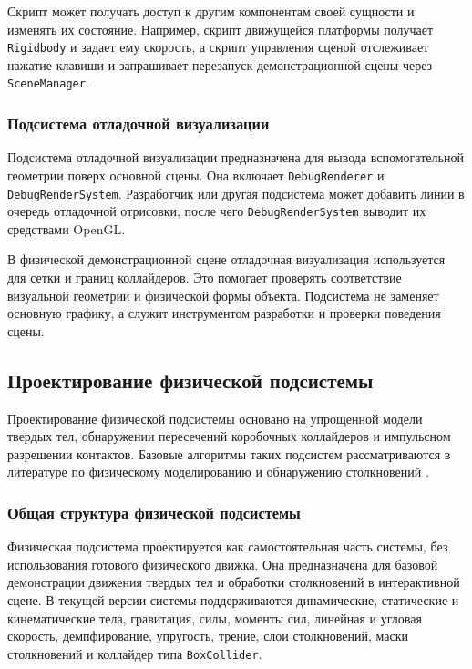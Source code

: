Скрипт может получать доступ к другим компонентам своей сущности и изменять их
состояние. Например, скрипт движущейся платформы получает \texttt{Rigidbody}
и задает ему скорость, а скрипт управления сценой отслеживает нажатие клавиши и
запрашивает перезапуск демонстрационной сцены через \texttt{SceneManager}.

\subsubsection{Подсистема отладочной визуализации}

Подсистема отладочной визуализации предназначена для вывода вспомогательной
геометрии поверх основной сцены. Она включает \texttt{DebugRenderer} и
\texttt{DebugRenderSystem}. Разработчик или другая подсистема может добавить
линии в очередь отладочной отрисовки, после чего \texttt{DebugRenderSystem}
выводит их средствами OpenGL.

В физической демонстрационной сцене отладочная визуализация используется для
сетки и границ коллайдеров. Это помогает проверять соответствие визуальной
геометрии и физической формы объекта. Подсистема не заменяет основную графику,
а служит инструментом разработки и проверки поведения сцены.

\subsection{Проектирование физической подсистемы}

Проектирование физической подсистемы основано на упрощенной модели твердых
тел, обнаружении пересечений коробочных коллайдеров и импульсном разрешении
контактов. Базовые алгоритмы таких подсистем рассматриваются в литературе по
физическому моделированию и обнаружению столкновений
\cite{ericson-collision,millington-physics,bergen-collision,mirtich-impulse,catto-iterative-dynamics,box2d-docs}.

\subsubsection{Общая структура физической подсистемы}

Физическая подсистема проектируется как самостоятельная часть системы, без
использования готового физического движка. Она предназначена для базовой
демонстрации движения твердых тел и обработки столкновений в интерактивной
сцене. В текущей версии системы
поддерживаются динамические, статические и кинематические тела, гравитация,
силы, моменты сил, линейная и угловая скорость, демпфирование, упругость,
трение, слои столкновений, маски столкновений и коллайдер типа \texttt{BoxCollider}.

